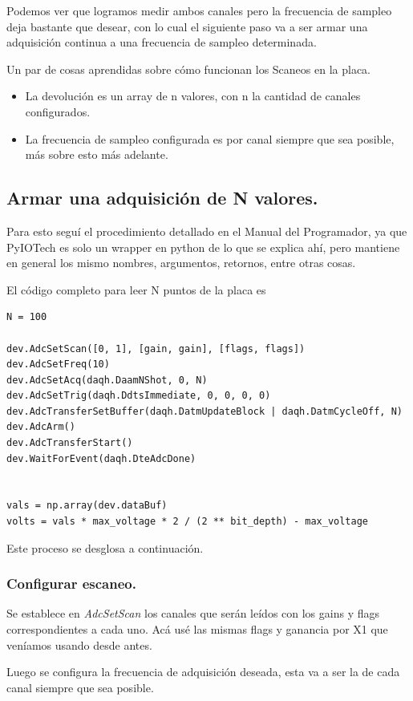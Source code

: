 Podemos ver que logramos medir ambos canales pero la frecuencia de sampleo deja bastante que desear, con lo cual el siguiente paso va a ser armar una adquisición continua a una frecuencia de sampleo determinada. 

Un par de cosas aprendidas sobre cómo funcionan los Scaneos en la placa. 
\begin{itemize}
	\item La devolución es un array de n valores, con n la cantidad de canales configurados. 
	\item La frecuencia de sampleo configurada es por canal siempre que sea posible, más sobre esto más adelante.
\end{itemize}

\subsection*{Armar una adquisición de N valores.}
Para esto seguí el procedimiento detallado en el Manual del Programador, ya que PyIOTech es solo un wrapper en python de lo que se explica ahí, pero mantiene en general los mismo nombres, argumentos, retornos, entre otras cosas. 

El código completo para leer N puntos de la placa es 

\begin{lstlisting}
N = 100

dev.AdcSetScan([0, 1], [gain, gain], [flags, flags])
dev.AdcSetFreq(10)
dev.AdcSetAcq(daqh.DaamNShot, 0, N)
dev.AdcSetTrig(daqh.DdtsImmediate, 0, 0, 0, 0)
dev.AdcTransferSetBuffer(daqh.DatmUpdateBlock | daqh.DatmCycleOff, N)
dev.AdcArm()
dev.AdcTransferStart()
dev.WaitForEvent(daqh.DteAdcDone)


vals = np.array(dev.dataBuf)
volts = vals * max_voltage * 2 / (2 ** bit_depth) - max_voltage

\end{lstlisting}

Este proceso se desglosa a continuación. 

\subsubsection*{Configurar escaneo.}
Se establece en \textit{AdcSetScan} los canales que serán leídos con los gains y flags correspondientes a cada uno. Acá usé las mismas flags y ganancia por X1 que veníamos usando desde antes. 

Luego se configura la frecuencia de adquisición deseada, esta va a ser la de cada canal siempre que sea posible. 

